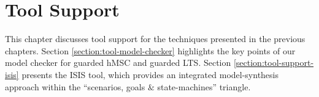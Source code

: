\chapter{Tool Support\label{chapter:tool-support}}

This chapter discusses tool support for the techniques presented in the previous chapters. Section \ref{section:tool-model-checker} highlights the key points of our model checker for guarded hMSC and guarded LTS. Section \ref{section:tool-support-isis} presents the ISIS tool, which provides an integrated model-synthesis approach within the ``scenarios, goals $\&$ state-machines'' triangle. 



%


